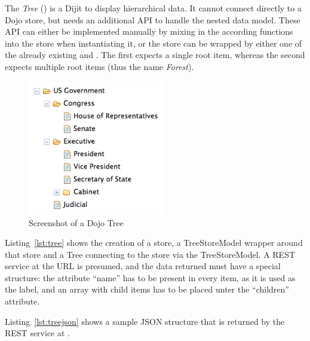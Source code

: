 The \emph{Tree} () is a Dijit to display hierarchical data. It cannot connect directly to a Dojo store, but needs an additional API to handle the nested data model. These API can either be implemented manually by mixing in the according functions into the store when instantiating it, or the store can be wrapped by either one of the already existing  and . The first expects a single root item, whereas the second expects multiple root items (thus the name \emph{Forest}).

\begin{figure}[H]
	\centering
	\includegraphics[width=6cm]{images/tree.png}
	\caption{Screenshot of a Dojo Tree}
	\label{fig:tree}
\end{figure}

Listing~\ref{lst:tree} shows the creation of a store, a TreeStoreModel wrapper around that store and a Tree connecting to the store via the TreeStoreModel. A REST service at the URL  is presumed, and the data returned must have a special structure: the attribute ``name'' has to be present in every item, as it is used as the label, and an array with child items has to be placed unter the ``children'' attribute.

Listing~\ref{lst:treejson} shows a sample JSON structure that is returned by the REST service at .


